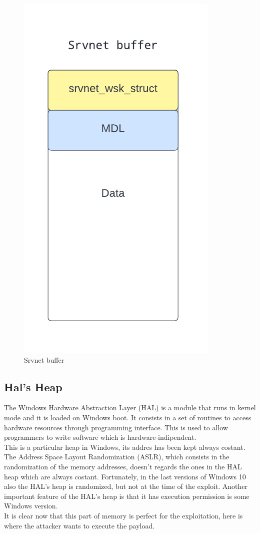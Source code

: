 \begin{figure}[ht!]
    \centering
      \includegraphics[scale=0.7]{images/srvnet_buffer.png}
      \caption{Srvnet buffer}
\end{figure}

\clearpage

\subsection{Hal's Heap}
The Windows Hardware Abstraction Layer (HAL) is a module that runs in kernel mode and it is loaded on Windows boot. It consists in a set of routines to access hardware resources
through programming interface. This is used to allow programmers to write software which is hardware-indipendent.\\
This is a particular heap in Windows, its addres has been kept always costant. The Address Space Layout Randomization (ASLR), which consists in the randomization of the memory addresses,
doesn't regards the ones in the HAL heap which are always costant.
Fortunately, in the last versions of Windows 10 also the HAL's heap is randomized, but not at the time of the exploit.
Another important feature of the HAL's heap is that it has execution permission is some Windows version.\\
It is clear now that this part of memory is perfect for the exploitation, here is where the attacker wants to execute the payload.

